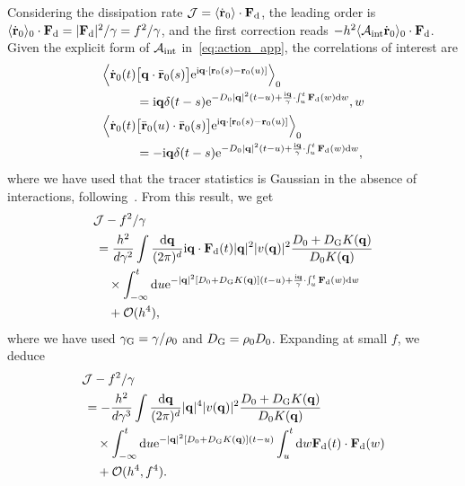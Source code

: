 \documentclass[superscriptaddress, twocolumn, prx, longbibliography, nofootinbib]{revtex4-1}
\begin{document}
Considering the dissipation rate ${\cal J}=\langle\dot{\bf r}_0\rangle\cdot{\bf F}_{\rm d}$, the leading order is $\langle\dot{\bf r}_0\rangle_0 \cdot {\bf F}_{\rm d} = |{\bf F}_{\rm d}|^2/\gamma = f^2/\gamma$, and the first correction reads $ - h^2 \langle{\cal A}_{\rm int}\dot{\bf r}_0\rangle_0 \cdot {\bf F}_{\rm d} $. Given the explicit form of ${\cal A}_{\rm int}$ in~\eqref{eq:action_app}, the correlations of interest are
\begin{equation}
	\begin{aligned}
		\Big\langle\dot{\bf r}_0(t) &\big[{\bf q}\cdot\bar{\bf r}_0(s)\big] {\rm e}^{{\rm i}{\bf q}\cdot[{\bf r}_0(s)-{\bf r}_0(u)]}\Big\rangle_0
		\\
		&= {\rm i}{\bf q}\delta(t-s){\rm e}^{ - D_0|{\bf q}|^2(t-u) + \frac{{\rm i}{\bf q}}{\gamma}\cdot\int_u^t {\bf F}_{\rm d}(w) {\rm d}w} ,w
		\\
		\Big\langle\dot{\bf r}_0(t) &\big[\bar{\bf r}_0(u)\cdot\bar{\bf r}_0(s)\big] {\rm e}^{{\rm i}{\bf q}\cdot[{\bf r}_0(s)-{\bf r}_0(u)]}\Big\rangle_0
		\\
		&= -{\rm i}{\bf q}\delta(t-s){\rm e}^{ - D_0|{\bf q}|^2(t-u) + \frac{{\rm i}{\bf q}}{\gamma}\cdot\int_u^t {\bf F}_{\rm d}(w) {\rm d}w} ,
	\end{aligned}
\end{equation}
where we have used that the tracer statistics is Gaussian in the absence of interactions, following~\cite{Demery2011, Demery2014}. From this result, we get
\begin{equation}
	\begin{aligned}
		&{\cal J} - f^2/\gamma
		\\
		&\,= \frac{h^2}{d\gamma^2} \int \frac{{\rm d}{\bf q}}{(2\pi)^d} {\rm i}{\bf q}\cdot{\bf F}_{\rm d}(t) |{\bf q}|^2 |v({\bf q})|^2 \frac{D_0+D_{\rm G}K({\bf q})}{D_0K({\bf q})}
		\\
		&\,\quad\times \int_{-\infty}^t {\rm d}u {\rm e}^{-|{\bf q}|^2 [D_0+D_{\rm G} K({\bf q})](t-u) + \frac{{\rm i}{\bf q}}{\gamma}\cdot\int_u^t{\bf F}_{\rm d}(w){\rm d}w}
		\\
		&\,\quad + {\cal O}(h^4) ,
	\end{aligned}
\end{equation}
where we have used $\gamma_{\rm G}=\gamma/\rho_0$ and $D_{\rm G}=\rho_0D_0$. Expanding at small $f$, we deduce
\begin{equation}\label{eq:diss}
	\begin{aligned}
		&{\cal J} - f^2/\gamma
		\\
		&\,= - \frac{h^2}{d\gamma^3} \int \frac{{\rm d}{\bf q}}{(2\pi)^d} |{\bf q}|^4 |v({\bf q})|^2 \frac{D_0+D_{\rm G}K({\bf q})}{D_0K({\bf q})}
		\\
		&\,\quad\times \int_{-\infty}^t {\rm d}u {\rm e}^{-|{\bf q}|^2 [D_0+D_{\rm G} K({\bf q})](t-u)} \int_u^t{\rm d}w{\bf F}_{\rm d}(t)\cdot{\bf F}_{\rm d}(w)
		\\
		&\,\quad + {\cal O}(h^4,f^4) .
	\end{aligned}
\end{equation}
\end{document}
